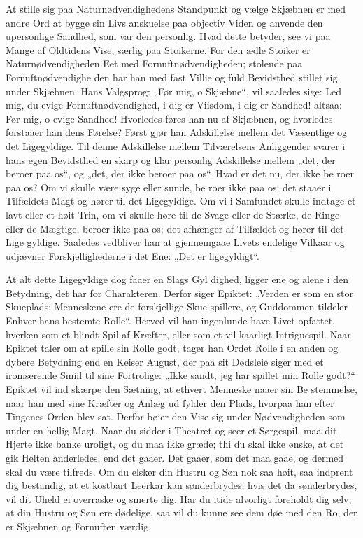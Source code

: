 \documentclass[12pt]{book}
\newcommand{\opage}[1]{\marginnote{\footnotesize\textit{[#1]}}}
\begin{document}
At stille sig paa Naturnødvendighedens Standpunkt og
vælge Skjæbnen er med andre Ord at bygge sin Livs\-%
anskuelse paa objectiv Viden og anvende den upersonlige
Sandhed, som var den personlig. Hvad dette betyder, see
vi paa Mange af Oldtidens Vise, særlig paa Stoikerne.
For den ædle Stoiker er Naturnødvendigheden Eet med
Fornuftnødvendigheden; stolende paa Fornuftnødvendighe\-%
den har han med fast Villie og fuld Bevidsthed stillet sig
under Skjæbnen. Hans Valgsprog: „Før mig, o Skjæbne“,
vil saaledes sige: Led mig, du evige Fornuftnødvendighed,
i dig er Viisdom, i dig er Sandhed! altsaa: Før mig, o
evige Sandhed! Hvorledes føres han nu af Skjæbnen,
og hvorledes forstaaer han dens Førelse? Først gjør han
Adskillelse mellem det Væsentlige og det Ligegyldige.
Til denne Adskillelse mellem Tilværelsens Anliggender
svarer i hans egen Bevidsthed en skarp og klar personlig
Adskillelse mellem „det, der beroer paa os“, og „det,
der ikke beroer paa os“. Hvad er det nu, der ikke be\-%
roer paa os? Om vi skulle være syge eller sunde, be\-%
roer ikke paa os; det staaer i Tilfældets Magt og hører
til det Ligegyldige. Om vi i Samfundet skulle indtage
et lavt eller et høit Trin, om vi skulle høre til de Svage
eller de Stærke, de Ringe eller de Mægtige, beroer ikke
paa os; det afhænger af Tilfældet og hører til det Lige\-%
gyldige. Saaledes vedbliver han at gjennemgaae Livets
endelige Vilkaar og udjævner Forskjellighederne i det
Ene: „Det er ligegyldigt“.

At alt dette Ligegyldige dog faaer en Slags Gyl\-%
dighed, ligger ene og alene i den Betydning, det har for
Charakteren. Derfor siger Epiktet: „Verden er som en
\opage{210}\setcounter{footnote}{0}%
stor Skueplads; Menneskene ere de forskjellige Skue\-%
spillere, og Guddommen tildeler Enhver hans bestemte
Rolle“. Herved vil han ingenlunde have Livet opfattet,
hverken som et blindt Spil af Kræfter, eller som et vil\-%
kaarligt Intriguespil. Naar Epiktet taler om at spille sin
Rolle godt, tager han Ordet Rolle i en anden og dybere
Betydning end en Keiser August, der paa sit Dødsleie
siger med et ironiserende Smiil til sine Fortrolige: „Ikke
sandt, jeg har spillet min Rolle godt?“ Epiktet vil ind\-%
skærpe den Sætning, at ethvert Menneske naaer sin Be\-%
stemmelse, naar han med sine Kræfter og Anlæg ud\-%
fylder den Plads, hvorpaa han efter Tingenes Orden blev
sat. Derfor bøier den Vise sig under Nødvendigheden
som under en hellig Magt. Naar du sidder i Theatret
og seer et Sørgespil, maa dit Hjerte ikke banke uroligt,
og du maa ikke græde; thi du skal ikke ønske, at det
gik Helten anderledes, end det gaaer. Det gaaer, som
det maa gaae, og dermed skal du være tilfreds. Om
du elsker din Hustru og Søn nok saa høit, saa indprent
dig bestandig, at et kostbart Leerkar kan sønderbrydes;
hvis det da sønderbrydes, vil dit Uheld ei overraske
og smerte dig. Har du itide alvorligt foreholdt dig selv,
at din Hustru og Søn ere dødelige, saa vil du kunne
see dem døe med den Ro, der er Skjæbnen og Fornuften
værdig.
\end{document}

